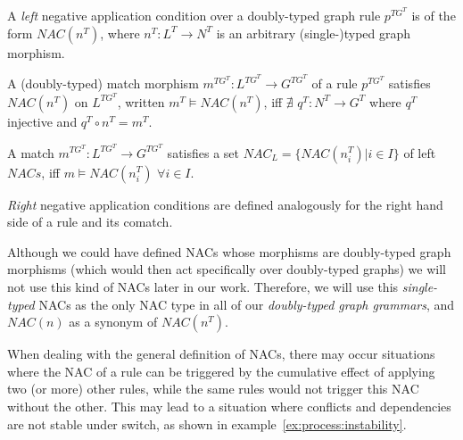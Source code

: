 \begin{definition} A \emph{left} negative application condition over a doubly-typed graph rule $p^{TG^T}$ is of the form $NAC(n^T)$, where $n^T : L^T \rightarrow N^T$ is an arbitrary (single-)typed graph morphism. 
 
A (doubly-typed) match morphism $m^{TG^T} : L^{TG^T} \rightarrow G^{TG^T}$ of a rule $p^{TG^T}$ satisfies $NAC(n^T)$ on $L^{TG^T}$, written \mbox{$m^T \models NAC(n^T)$}, iff $\nexists$ $q^T : N^T \rightarrow G^T$ where $q^T$ injective and $q^T \circ n^T = m^T$.


  A match $m^{TG^T} : L^{TG^T} \rightarrow G^{TG^T}$ satisfies a set \mbox{$NAC_L = \{NAC\left(n^T_i\right)|i \in I\}$} of left $NACs$, iff \mbox{$m \models NAC\left(n^T_i\right)$} $\forall i \in I$.

\emph{Right} negative application conditions are defined analogously for the right hand side of a rule and its comatch.


\end{definition}

\begin{example}
\end{example}

\begin{remark}
Although we could have defined NACs whose morphisms are doubly-typed graph morphisms (which would then act specifically over doubly-typed graphs) we will not use this kind of NACs later in our work. Therefore, we will use this \emph{single-typed} NACs as the only NAC type in all of our \emph{doubly-typed graph grammars}, and $NAC(n)$ as a synonym of $NAC(n^T)$.
\end{remark}

When dealing with the general definition of NACs, there may occur situations where the NAC of a rule can be triggered by the cumulative effect of applying two (or more) other rules, while the same rules would not trigger this NAC without the other. This may lead to a situation where conflicts and dependencies are not stable under switch, as shown in example~\ref{ex:process:instability}.

